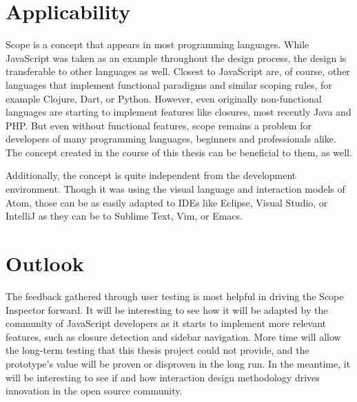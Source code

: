 \section{Applicability}\label{applicability}

Scope is a concept that appears in most programming languages. While
JavaScript was taken as an example throughout the design process, the
design is transferable to other languages as well. Closest to JavaScript
are, of course, other languages that implement functional paradigms and
similar scoping rules, for example Clojure, Dart, or Python. However,
even originally non-functional languages are starting to implement
features like closures, most recently Java and PHP. But even without
functional features, scope remains a problem for developers of many
programming languages, beginners and professionals alike. The concept
created in the course of this thesis can be beneficial to them, as well.

Additionally, the concept is quite independent from the development
environment. Though it was using the visual language and interaction
models of Atom, those can be as easily adapted to IDEs like Eclipse,
Visual Studio, or IntelliJ as they can be to Sublime Text, Vim, or
Emacs.

\section{Outlook}\label{outlook}

The feedback gathered through user testing is most helpful in driving
the Scope Inspector forward. It will be interesting to see how it will
be adapted by the community of JavaScript developers as it starts to
implement more relevant features, such as closure detection and sidebar
navigation. More time will allow the long-term testing that this thesis
project could not provide, and the prototype’s value will be proven or
disproven in the long run. In the meantime, it will be interesting to
see if and how interaction design methodology drives innovation in the
open source community.
